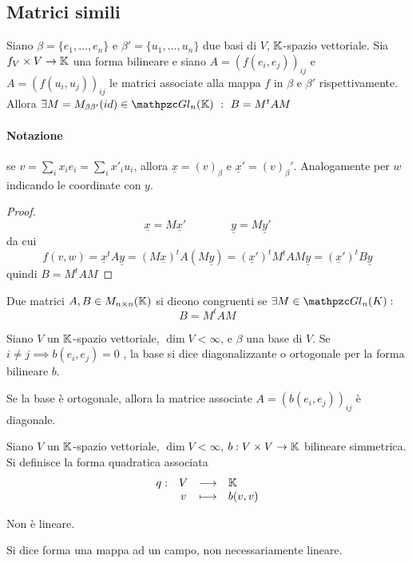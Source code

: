 \documentclass{article}     %
\let\undl\underline
\begin{document}
\subsection{Matrici simili}
\begin{lemma}
    Siano $\beta=\{e_1, \dots, e_n\}$ e $\beta'=\{u_1, \dots, u_n\}$ due basi di $V$, $\mathbb{K}$-spazio vettoriale. Sia $f_V\times V\to \mathbb{K}$ una forma bilineare e siano $A=(f(e_i,e_j))_{ij}$ e $A=(f(u_i,u_j))_{ij}$ le matrici associate alla mappa $f$ in $\beta $ e $\beta'$ rispettivamente. Allora $\exists M=M_{\beta\beta'}(id)\in \gln{n}{\K}\ :\ B=M^t AM$
\end{lemma}
\paragraph{Notazione} se $v= \sum_ix_ie_i= \sum _ix'_iu_i$, allora $\underline x = (v)_\beta$ e $\underline x' = (v)_\beta'$. Analogamente per $w$ indicando le coordinate con $y$.
\begin{proof}
    \[\underline{x} = M\undl x'\qquad \qquad \undl y = M \undl y'\]
    da cui 
    \[f(v,w)= \undl x^tA \undl y = (M\undl x)^t A (M\undl y) = ( \undl x')^tM^tAM\undl y = ( \undl x')^t B \undl y\]
    quindi $B=M^tAM$
\end{proof}
\begin{boxdef}
    Due matrici $A,B\in M_{n\times n}(\mathbb{K})$ si dicono congruenti se $\exists M \in \gln{n}{K}:$
    \[B=M^tAM\]
\end{boxdef}

\begin{boxdef}
    Siano $V$ un $\mathbb{K}$-spazio vettoriale, $\dim V<\infty$, e $\beta$ una base di $V$. Se $i\neq j\implies b(e_i,e_j)=0$ , la base si dice diagonalizzante o ortogonale per la forma bilineare $b$. 
\end{boxdef}
\begin{oss}
    Se la base è ortogonale, allora la matrice associate $A=(b(e_i,e_j))_{ij}$ è diagonale.
\end{oss}

\begin{boxdef}
    Siano $V$ un $\mathbb{K}$-spazio vettoriale, $\dim V<\infty$, $b: V\times V \to \mathbb{K}$ bilineare simmetrica. Si definisce la forma quadratica associata
    \[\begin{array}{cccl} q : & V & \longrightarrow & \mathbb{K} \\ & v & \longmapsto & b(v,v) \end{array}\]
\end{boxdef}
\begin{oss}
    Non è lineare.
\end{oss}
\begin{ricorda}
    Si dice forma una mappa ad un campo, non necessariamente lineare. 
\end{ricorda}
\end{document}
